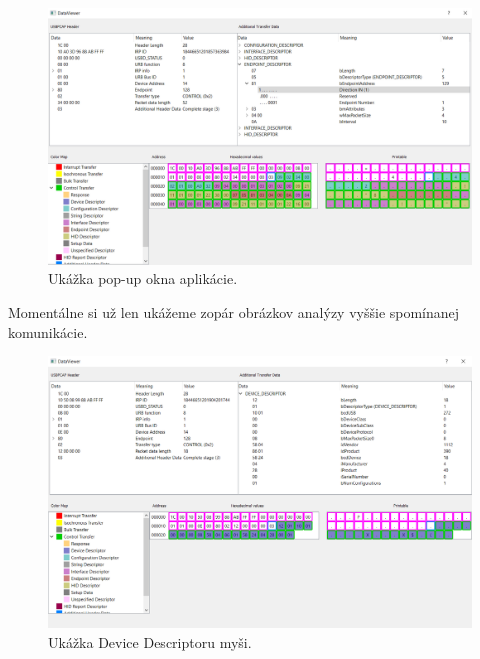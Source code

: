 \begin{figure}[!htb]
	\centering
	\includegraphics[width=\textwidth]{img/kap06_uk_popup}
	\caption{Ukážka pop-up okna aplikácie.}
	\label{obr:kap6:uk_popup}
\end{figure}

Momentálne si už len ukážeme zopár obrázkov analýzy vyššie spomínanej komunikácie.

\begin{figure}[!htb]
	\centering
	\includegraphics[width=\textwidth]{img/kap06_device_desc}
	\caption{Ukážka Device Descriptoru myši.}
	\label{obr:kap6:uk_device_desc}
\end{figure}

